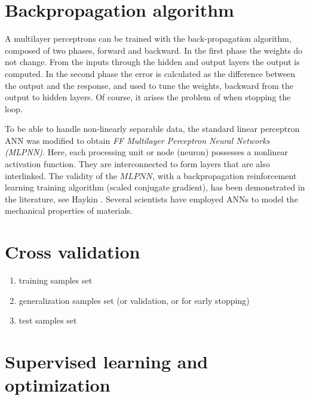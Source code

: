 
\section{Backpropagation algorithm}
\label{sec:backpropagationalgorithm}

A multilayer perceptrons can be trained with the back-propagation algorithm,
composed of two phases, forward and backward.
In the first phase the weights do not change. 
From the inputs through the hidden
and output layers the output is computed. 
In the second phase the error is calculated as the difference between the output
and the response, and used to tune the weights, backward from the output to
hidden layers.
Of course, it arises the problem of when stopping the loop.


To be able to handle non-linearly separable data, the standard linear perceptron
\acs{ANN} was modified to obtain \textit{FF Multilayer Perceptron Neural Networks
(MLPNN)}.
Here, each processing unit or node (neuron) possesses a nonlinear activation function. 
They are interconnected to form layers that are also interlinked. 
The validity of the $MLPNN$, with a backpropagation reinforcement learning 
training algorithm (scaled conjugate gradient), has been demonstrated in the 
literature, see Haykin \cite{RefWorks:158}. Several scientists 
\cite{RefWorks:161, RefWorks:166, RefWorks:167, RefWorks:168, RefWorks:169,
RefWorks:170, RefWorks:178, RefWorks:179} have employed \acs{ANNs} to model
the mechanical properties of materials.

\section{Cross validation}
\label{sec:crossvalidation}

\begin{enumerate}
  \item{training samples set}
  \item{generalization samples set (or validation, or for early stopping)}
  \item{test samples set}
\end{enumerate}

\section{Supervised learning and optimization}
\label{sec:supervisedlearningandoptimization}

